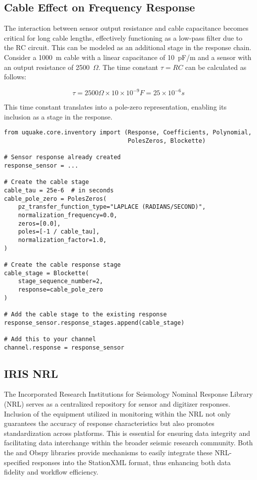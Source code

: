 \subsection{Cable Effect on Frequency Response}

The interaction between sensor output resistance and cable capacitance becomes critical for long cable lengths, effectively functioning as a low-pass filter due to the RC circuit. This can be modeled as an additional stage in the response chain. Consider a 1000~m cable with a linear capacitance of 10~pF/m and a sensor with an output resistance of 2500~$\Omega$. The time constant \(\tau = RC\) can be calculated as follows:

\[
\tau = 2500 \Omega \times 10 \times 10^{-9} F = 25 \times 10^{-6} s
\]

This time constant translates into a pole-zero representation, enabling its inclusion as a stage in the response.

\begin{verbatim}
from uquake.core.inventory import (Response, Coefficients, Polynomial, 
                                   PolesZeros, Blockette)

# Sensor response already created
response_sensor = ...

# Create the cable stage
cable_tau = 25e-6  # in seconds
cable_pole_zero = PolesZeros(
    pz_transfer_function_type="LAPLACE (RADIANS/SECOND)",
    normalization_frequency=0.0,
    zeros=[0.0],
    poles=[-1 / cable_tau],
    normalization_factor=1.0,
)

# Create the cable response stage
cable_stage = Blockette(
    stage_sequence_number=2,
    response=cable_pole_zero
)

# Add the cable stage to the existing response
response_sensor.response_stages.append(cable_stage)

# Add this to your channel
channel.response = response_sensor
\end{verbatim}



\subsection{IRIS NRL}
The Incorporated Research Institutions for Seismology Nominal Response Library (\gls{NRL}) serves as a centralized repository for sensor and digitizer responses. Inclusion of the equipment utilized in \museismic monitoring within the NRL not only guarantees the accuracy of response characteristics but also promotes standardization across platforms. This is essential for ensuring data integrity and facilitating data interchange within the broader seismic research community. Both the \muquake and Obspy libraries provide mechanisms to easily integrate these NRL-specified responses into the StationXML format, thus enhancing both data fidelity and workflow efficiency.



